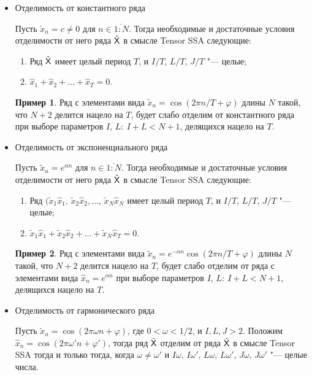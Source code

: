 \documentclass[specialist,
    substylefile = spbu_report.rtx,
    subf,href,colorlinks=true, 12pt]{disser}
\theoremstyle{plain}
\theoremstyle{definition}
\newtheorem{example}{Пример}[section]
\theoremstyle{remark}
\begin{document}
    \begin{itemize}
        \item Отделимость от константного ряда

        Пусть $\tilde{x}_n=c\ne 0$ для $n\in\overline{1:N}$.
        Тогда необходимые и достаточные условия отделимости от него ряда $\hat{\mathsf{X}}$ в смысле Tensor SSA следующие:
        \begin{enumerate}
            \item Ряд $\hat{\mathsf{X}}$ имеет целый период $T$, и $I/T$, $L/T$, $J/T$ "--- целые;
            \item $\hat{x}_{1}+\hat{x}_2+\ldots+\hat{x}_T=0$.
        \end{enumerate}
        \begin{example}
            Ряд с элементами вида $\tilde{x}_n=\cos(2\pi n / T + \varphi)$ длины $N$ такой, что $N+2$ делится нацело на
            $T$, будет слабо отделим от константного ряда при выборе параметров $I,\, L:\: I+L< N+1$, делящихся нацело на $T$.
        \end{example}
        \item Отделимость от экспоненциального ряда

        Пусть $\tilde{x}_n=e^{\alpha n}$ для $n\in\overline{1:N}$.
        Тогда необходимые и достаточные условия отделимости от него ряда $\hat{\mathsf{X}}$ в смысле Tensor SSA следующие:
        \begin{enumerate}
            \item Ряд $(\tilde{x}_{1}\hat{x}_{1},\, \tilde{x}_{2}\hat{x}_{2},\ldots,\, \tilde{x}_{N}\hat{x}_{N}$
            имеет целый период $T$, и $I/T$, $L/T$, $J/T$ "--- целые;
            \item $\tilde{x}_{1}\hat{x}_{1}+\tilde{x}_{2}\hat{x}_2+\ldots+\tilde{x}_{N}\hat{x}_T=0$.
        \end{enumerate}
        \begin{example}
            Ряд с элементами вида $\tilde{x}_n=e^{-\alpha n}\cos(2\pi n / T + \varphi)$ длины $N$ такой, что $N+2$ делится нацело на
            $T$, будет слабо отделим от ряда с элементами вида $\hat{x}_n=e^{\alpha n}$ при выборе параметров $I,\, L:\: I+L< N+1$, делящихся нацело на $T$.
        \end{example}
        \item Отделимость от гармонического ряда

        Пусть $\tilde{x}_n=\cos(2\pi \omega n + \varphi)$, где $0 < \omega < 1/2$, и $I, L, J > 2$.
        Положим $\hat{x}_n=\cos(2\pi \omega' n + \varphi')$,
        тогда ряд $\tilde{\mathsf{X}}$ отделим от ряда $\hat{\mathsf{X}}$ в смысле Tensor SSA тогда и только тогда, когда $\omega\ne\omega'$
        и $I\omega,\, I\omega',\, L\omega,\, L\omega',\, J\omega,\, J\omega'$ "--- целые числа.
    \end{itemize}
\end{document}

